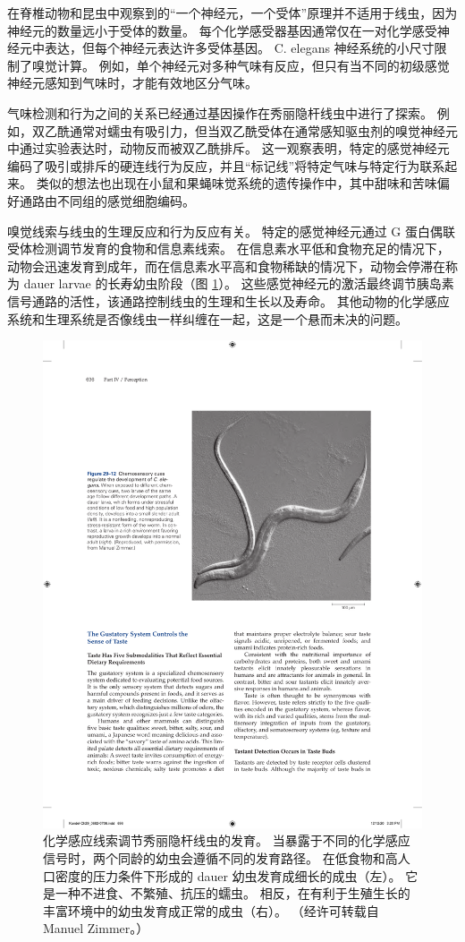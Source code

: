 在脊椎动物和昆虫中观察到的“一个神经元，一个受体”原理并不适用于线虫，因为神经元的数量远小于受体的数量。 每个化学感受器基因通常仅在一对化学感受神经元中表达，但每个神经元表达许多受体基因。 C. elegans 神经系统的小尺寸限制了嗅觉计算。 例如，单个神经元对多种气味有反应，但只有当不同的初级感觉神经元感知到气味时，才能有效地区分气味。

气味检测和行为之间的关系已经通过基因操作在秀丽隐杆线虫中进行了探索。 例如，双乙酰通常对蠕虫有吸引力，但当双乙酰受体在通常感知驱虫剂的嗅觉神经元中通过实验表达时，动物反而被双乙酰排斥。 这一观察表明，特定的感觉神经元编码了吸引或排斥的硬连线行为反应，并且“标记线”将特定气味与特定行为联系起来。 类似的想法也出现在小鼠和果蝇味觉系统的遗传操作中，其中甜味和苦味偏好通路由不同组的感觉细胞编码。

嗅觉线索与线虫的生理反应和行为反应有关。 特定的感觉神经元通过 G 蛋白偶联受体检测调节发育的食物和信息素线索。 
在信息素水平低和食物充足的情况下，动物会迅速发育到成年，而在信息素水平高和食物稀缺的情况下，动物会停滞在称为 dauer larvae 的长寿幼虫阶段（图 \ref{fig:29_12}）。 
这些感觉神经元的激活最终调节胰岛素信号通路的活性，该通路控制线虫的生理和生长以及寿命。 其他动物的化学感应系统和生理系统是否像线虫一样纠缠在一起，这是一个悬而未决的问题。

\begin{figure}[htbp]
	\centering
	\includegraphics[width=0.6\linewidth]{chap29/fig_29_12}
	\caption{化学感应线索调节秀丽隐杆线虫的发育。 当暴露于不同的化学感应信号时，两个同龄的幼虫会遵循不同的发育路径。 在低食物和高人口密度的压力条件下形成的 dauer 幼虫发育成细长的成虫（左）。 它是一种不进食、不繁殖、抗压的蠕虫。 相反，在有利于生殖生长的丰富环境中的幼虫发育成正常的成虫（右）。 （经许可转载自 Manuel Zimmer。）}
	\label{fig:29_12}
\end{figure}

